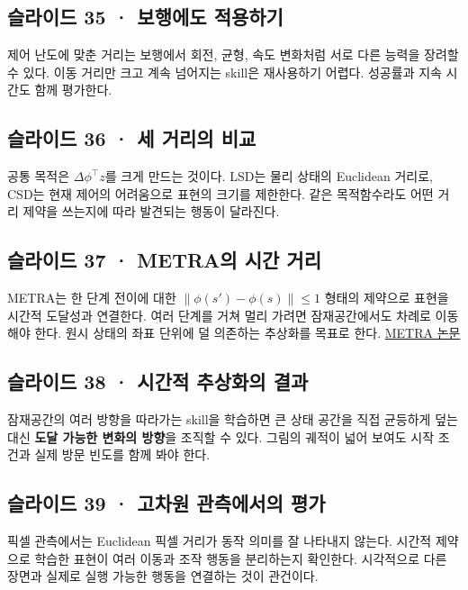 \documentclass[11pt,a4paper]{article}
\begin{document}
\subsection{슬라이드 35 · 보행에도 적용하기}

제어 난도에 맞춘 거리는 보행에서 회전, 균형, 속도 변화처럼 서로 다른 능력을 장려할 수 있다. 이동 거리만 크고 계속 넘어지는 skill은 재사용하기 어렵다. 성공률과 지속 시간도 함께 평가한다.\par

\subsection{슬라이드 36 · 세 거리의 비교}

공통 목적은 $\Delta\phi^\top z$를 크게 만드는 것이다. LSD는 물리 상태의 Euclidean 거리로, CSD는 현재 제어의 어려움으로 표현의 크기를 제한한다. 같은 목적함수라도 어떤 거리 제약을 쓰는지에 따라 발견되는 행동이 달라진다.\par

\subsection{슬라이드 37 · METRA의 시간 거리}

METRA는 한 단계 전이에 대한 $\|\phi(s')-\phi(s)\|\le1$ 형태의 제약으로 표현을 시간적 도달성과 연결한다. 여러 단계를 거쳐 멀리 가려면 잠재공간에서도 차례로 이동해야 한다. 원시 상태의 좌표 단위에 덜 의존하는 추상화를 목표로 한다. \href{https://arxiv.org/abs/2310.08887}{METRA 논문}\par

\subsection{슬라이드 38 · 시간적 추상화의 결과}

잠재공간의 여러 방향을 따라가는 skill을 학습하면 큰 상태 공간을 직접 균등하게 덮는 대신 \textbf{도달 가능한 변화의 방향}을 조직할 수 있다. 그림의 궤적이 넓어 보여도 시작 조건과 실제 방문 빈도를 함께 봐야 한다.\par

\subsection{슬라이드 39 · 고차원 관측에서의 평가}

픽셀 관측에서는 Euclidean 픽셀 거리가 동작 의미를 잘 나타내지 않는다. 시간적 제약으로 학습한 표현이 여러 이동과 조작 행동을 분리하는지 확인한다. 시각적으로 다른 장면과 실제로 실행 가능한 행동을 연결하는 것이 관건이다.\par
\end{document}
